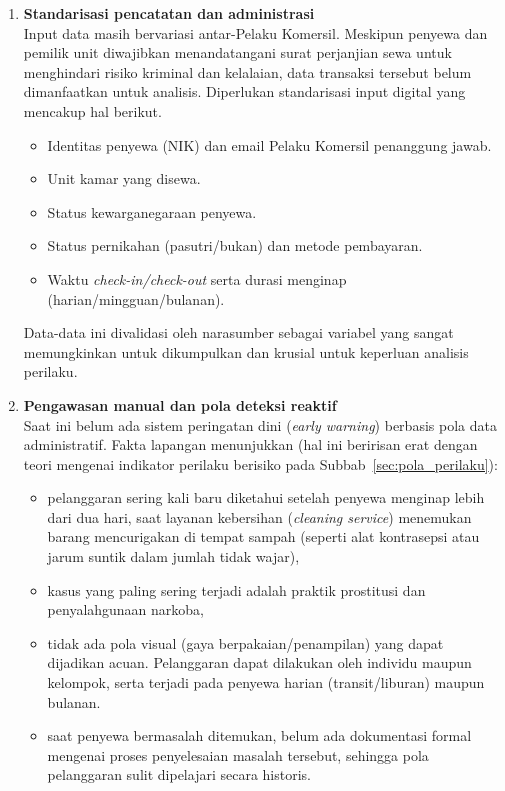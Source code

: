 \begin{enumerate}
    \item \textbf{Standarisasi pencatatan dan administrasi} \\
    Input data masih bervariasi antar-Pelaku Komersil. Meskipun penyewa dan pemilik unit diwajibkan menandatangani surat perjanjian sewa untuk menghindari risiko kriminal dan kelalaian, data transaksi tersebut belum dimanfaatkan untuk analisis. Diperlukan standarisasi input digital yang mencakup hal berikut.
    \begin{itemize}
        \item Identitas penyewa (NIK) dan email Pelaku Komersil penanggung jawab.
        \item Unit kamar yang disewa.
        \item Status kewarganegaraan penyewa.
        \item Status pernikahan (pasutri/bukan) dan metode pembayaran.
        \item Waktu \textit{check-in/check-out} serta durasi menginap (harian/mingguan/bulanan).
    \end{itemize}
    Data-data ini divalidasi oleh narasumber sebagai variabel yang sangat memungkinkan untuk dikumpulkan dan krusial untuk keperluan analisis perilaku.

    \item \textbf{Pengawasan manual dan pola deteksi reaktif} \\
    Saat ini belum ada sistem peringatan dini (\textit{early warning}) berbasis pola data administratif. Fakta lapangan menunjukkan (hal ini beririsan erat dengan teori mengenai indikator perilaku berisiko pada Subbab~\ref{sec:pola_perilaku}):
    \begin{itemize}
        \item pelanggaran sering kali baru diketahui setelah penyewa menginap lebih dari dua hari, saat layanan kebersihan (\textit{cleaning service}) menemukan barang mencurigakan di tempat sampah (seperti alat kontrasepsi atau jarum suntik dalam jumlah tidak wajar),
        \item kasus yang paling sering terjadi adalah praktik prostitusi dan penyalahgunaan narkoba,
        \item tidak ada pola visual (gaya berpakaian/penampilan) yang dapat dijadikan acuan. Pelanggaran dapat dilakukan oleh individu maupun kelompok, serta terjadi pada penyewa harian (transit/liburan) maupun bulanan.
        \item saat penyewa bermasalah ditemukan, belum ada dokumentasi formal mengenai proses penyelesaian masalah tersebut, sehingga pola pelanggaran sulit dipelajari secara historis.
    \end{itemize}
\end{enumerate}

